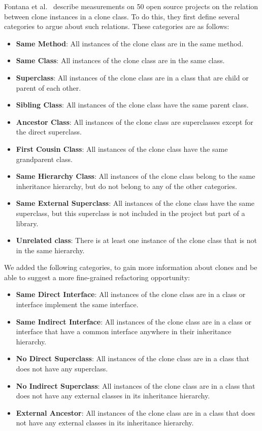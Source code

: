 \documentclass[runningheads]{llncs}
\begin{document}
Fontana et al.~\cite{fontana2015duplicated} describe measurements on 50 open source projects on the relation between clone instances in a clone class. To do this, they first define several categories to argue about such relations. These categories are as follows:
\begin{itemize}
  \item \textbf{Same Method}: All instances of the clone class are in the same method.
  \item \textbf{Same Class}: All instances of the clone class are in the same class.
  \item \textbf{Superclass}: All instances of the clone class are in a class that are child or parent of each other.
  \item \textbf{Sibling Class}: All instances of the clone class have the same parent class.
    \item \textbf{Ancestor Class}: All instances of the clone class are superclasses except for the direct superclass.
  \item \textbf{First Cousin Class}: All instances of the clone class have the same grandparent class.
    \item \textbf{Same Hierarchy Class}: All instances of the clone class belong to the same inheritance hierarchy, but do not belong to any of the other categories.
\item \textbf{Same External Superclass}: All instances of the clone class have the same superclass, but this superclass is not included in the project but part of a library.
\item \textbf{Unrelated class}: There is at least one instance of the clone class that is not in the same hierarchy.
\end{itemize}

We added the following categories, to gain more information about clones and be able to suggest a more fine-grained refactoring opportunity:

\begin{itemize}
\item \textbf{Same Direct Interface}: All instances of the clone class are in a class or interface implement the same interface.
\item \textbf{Same Indirect Interface}: All instances of the clone class are in a class or interface that have a common interface anywhere in their inheritance hierarchy.
\item \textbf{No Direct Superclass}: All instances of the clone class are in a class that does not have any superclass.
\item \textbf{No Indirect Superclass}: All instances of the clone class are in a class that does not have any external classes in its inheritance hierarchy.
\item \textbf{External Ancestor}: All instances of the clone class are in a class that does not have any external classes in its inheritance hierarchy.
\end{itemize}
\end{document}
